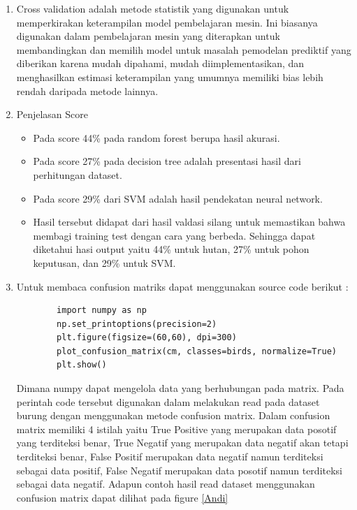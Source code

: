 \begin{enumerate}
\item Cross validation adalah metode statistik yang digunakan untuk memperkirakan keterampilan model pembelajaran mesin. Ini biasanya digunakan dalam pembelajaran mesin yang diterapkan untuk membandingkan dan memilih model untuk masalah pemodelan prediktif yang diberikan karena mudah dipahami, mudah diimplementasikan, dan menghasilkan estimasi keterampilan yang umumnya memiliki bias lebih rendah daripada metode lainnya.

\item Penjelasan Score
	\begin{itemize}
		\item Pada score 44\% pada random forest berupa hasil akurasi.
		\item Pada score 27\% pada decision tree adalah presentasi hasil dari perhitungan dataset.
		\item Pada  score 29\% dari SVM adalah hasil pendekatan neural network.
		\item Hasil tersebut didapat dari hasil valdasi silang untuk memastikan bahwa membagi  training test dengan cara yang berbeda. Sehingga dapat diketahui hasi output yaitu 44\% untuk hutan, 27\% untuk pohon keputusan, dan 29\% untuk SVM.
	\end{itemize}

\item Untuk membaca confusion matriks dapat menggunakan source code berikut :
	\begin{verbatim}
		import numpy as np
		np.set_printoptions(precision=2)
		plt.figure(figsize=(60,60), dpi=300)
		plot_confusion_matrix(cm, classes=birds, normalize=True)
		plt.show()
	\end{verbatim}

Dimana numpy dapat mengelola data yang berhubungan pada matrix. Pada perintah code tersebut digunakan dalam melakukan read pada dataset burung dengan menggunakan metode confusion matrix. Dalam confusion matrix memiliki 4 istilah yaitu True Positive yang merupakan data posotif yang terditeksi benar, True Negatif yang merupakan data negatif akan tetapi terditeksi benar, False Positif merupakan data negatif namun terditeksi sebagai data positif, False Negatif merupakan data posotif namun terditeksi sebagai data negatif. Adapun contoh hasil read dataset menggunakan confusion matrix dapat dilihat pada figure \ref{Andi}


\end{enumerate}
